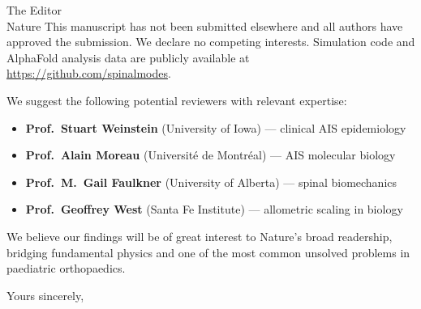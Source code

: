 \documentclass[12pt]{letter}
\begin{document}
\begin{letter}{The Editor\\Nature}
This manuscript has not been submitted elsewhere and all authors have approved the submission. We declare no competing interests. Simulation code and AlphaFold analysis data are publicly available at \url{https://github.com/spinalmodes}.

We suggest the following potential reviewers with relevant expertise:

\begin{itemize}
\item \textbf{Prof.\ Stuart Weinstein} (University of Iowa) --- clinical AIS epidemiology
\item \textbf{Prof.\ Alain Moreau} (Universit\'{e} de Montr\'{e}al) --- AIS molecular biology
\item \textbf{Prof.\ M.\ Gail Faulkner} (University of Alberta) --- spinal biomechanics
\item \textbf{Prof.\ Geoffrey West} (Santa Fe Institute) --- allometric scaling in biology
\end{itemize}

We believe our findings will be of great interest to Nature's broad readership, bridging fundamental physics and one of the most common unsolved problems in paediatric orthopaedics.

\closing{Yours sincerely,}

\end{letter}
\end{document}
